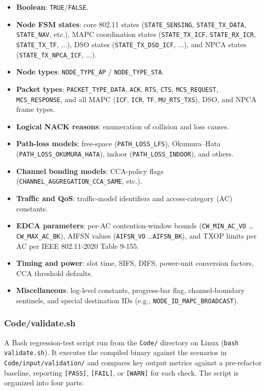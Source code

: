 \documentclass[11pt,a4paper]{article}
\begin{document}
\begin{itemize}
    \item \textbf{Boolean}: \texttt{TRUE}/\texttt{FALSE}.
    \item \textbf{Node FSM states}: core 802.11 states (\texttt{STATE\_SENSING}, \texttt{STATE\_TX\_DATA}, \texttt{STATE\_NAV}, etc.), MAPC coordination states (\texttt{STATE\_TX\_ICF}, \texttt{STATE\_RX\_ICR}, \texttt{STATE\_TX\_TF}, ...), DSO states (\texttt{STATE\_TX\_DSO\_ICF}, ...), and NPCA states (\texttt{STATE\_TX\_NPCA\_ICF}, ...).
    \item \textbf{Node types}: \texttt{NODE\_TYPE\_AP} / \texttt{NODE\_TYPE\_STA}.
    \item \textbf{Packet types}: \texttt{PACKET\_TYPE\_DATA}, \texttt{ACK}, \texttt{RTS}, \texttt{CTS}, \texttt{MCS\_REQUEST}, \texttt{MCS\_RESPONSE}, and all MAPC (\texttt{ICF}, \texttt{ICR}, \texttt{TF}, \texttt{MU\_RTS\_TXS}), DSO, and NPCA frame types.
    \item \textbf{Logical NACK reasons}: enumeration of collision and loss causes.
    \item \textbf{Path-loss models}: free-space (\texttt{PATH\_LOSS\_LFS}), Okumura--Hata (\texttt{PATH\_LOSS\_OKUMURA\_HATA}), indoor (\texttt{PATH\_LOSS\_INDOOR}), and others.
    \item \textbf{Channel bonding models}: CCA-policy flags (\texttt{CHANNEL\_AGGREGATION\_CCA\_SAME}, etc.).
    \item \textbf{Traffic and QoS}: traffic-model identifiers and access-category (AC) constants.
    \item \textbf{EDCA parameters}: per-AC contention-window bounds (\texttt{CW\_MIN\_AC\_VO} \ldots \texttt{CW\_MAX\_AC\_BK}), AIFSN values (\texttt{AIFSN\_VO} \ldots \texttt{AIFSN\_BK}), and TXOP limits per AC per IEEE 802.11-2020 Table 9-155.
    \item \textbf{Timing and power}: slot time, SIFS, DIFS, power-unit conversion factors, CCA threshold defaults.
    \item \textbf{Miscellaneous}: log-level constants, progress-bar flag, channel-boundary sentinels, and special destination IDs (e.g., \texttt{NODE\_ID\_MAPC\_BROADCAST}).
\end{itemize}

\subsubsection{Code/validate.sh}

A Bash regression-test script run from the \texttt{Code/} directory on Linux (\texttt{bash validate.sh}). It executes the compiled binary against the scenarios in \texttt{Code/input/validation/} and compares key output metrics against a pre-refactor baseline, reporting \texttt{[PASS]}, \texttt{[FAIL]}, or \texttt{[WARN]} for each check. The script is organized into four parts:
\end{document}
